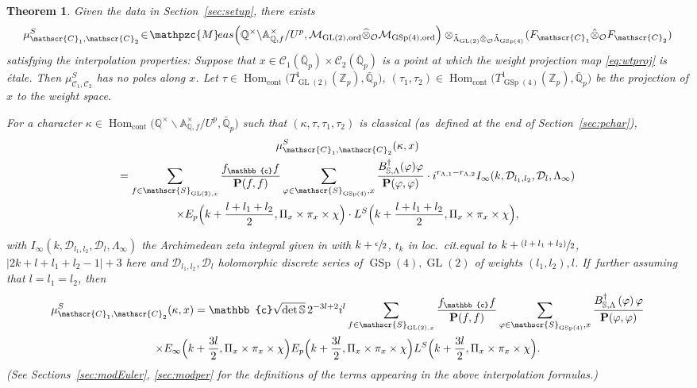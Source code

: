 \documentclass[10pt]{amsart}
\newcommand{\loccit}{loc.\ cit.}
\newcommand{\psfrac}[2]{\sfrac{(#1)}{#2}}
\theoremstyle{plain}
\newtheorem{thm}{Theorem}[subsection]
\theoremstyle{remark}
\newcommand{\bA}{\mathbb{A}}
\newcommand{\bQ}{\mathbb{Q}}
\newcommand{\bS}{\mathbb{S}}
\newcommand{\bZ}{\mathbb{Z}}
\newcommand{\bbc}{\mathbb{c}}
\newcommand{\cD}{\mathcal{D}}
\newcommand{\cM}{\mathcal{M}}
\newcommand{\cO}{\mathcal{O}}
\newcommand{\sC}{\mathscr{C}}
\newcommand{\sS}{\mathscr{S}}
\newcommand{\bfP}{\mathbf{P}}
\DeclareMathOperator{\GL}{GL}
\DeclareMathOperator{\GSp}{GSp}
\newcommand{\Meas}{\mathpzc{M}\mkern-2mu eas}
\newcommand{\cont}{\mathrm{cont}}
\newcommand{\ord}{\mathrm{ord}}
\DeclareMathOperator{\Hom}{Hom}
\let\wh\widehat
\let\bes B
\newcommand{\sLambda}{\scriptscriptstyle{\Lambda}}
\begin{document}
\begin{thm}\label{thm:pFL1}
Given the data in Section~\ref{sec:setup}, there exists
\[
\mu^S_{\sC_1,\sC_2}\!\in\!
\Meas\Bigl(\bQ^\times\backslash\bA^\times_{\bQ,f}/U^p,\cM_{\GL(2),\ord}\wh{\otimes}_{\cO} \cM_{\GSp(4),\ord}\Bigr)
\otimes_{\tilde{\Lambda}_{\GL(2)}\hat{\otimes}_\cO\tilde{\Lambda}_{\GSp(4)}}\!(F_{\sC_1}\hat{\otimes}_\cO F_{\sC_2})
\]
satisfying the interpolation properties: Suppose that $x\in \sC_1(\bar{\bQ}_p)\times\sC_2(\bar{\bQ}_p)$ is a point at which the weight projection map \eqref{eq:wtproj} is \'{e}tale. Then $ \mu^S_{\sC_1,\sC_2}$ has no poles along $x$. Let $\tau\in\Hom_\cont\bigl(T^1_{\GL(2)}(\bZ_p),\bar{\bQ}_p\bigr)$, $(\tau_1,\tau_2)\in \Hom_\cont\bigl(T^1_{\GSp(4)}(\bZ_p),\bar{\bQ}_p\bigr)$ be the projection of $x$ to the weight space.
\par\noindent
\begin{minipage}{\textwidth}
For a character $\kappa\in \Hom_\cont\bigl(\bQ^\times\backslash\bA^\times_{\bQ,f}/U^p,\bar{\bQ}_p\bigr)$ such that $(\kappa,\tau,\tau_1,\tau_2)$ is classical (as~defined at the end of Section~\ref{sec:pchar}),
\begin{multline}\label{eq:partial-int}
\mu^S_{\sC_1,\sC_2}(\kappa,x)\\
=\sum_{f\in \sS_{\GL(2),x}} \frac{f_{\bbc}f}{\bfP(f,f)}\sum_{\varphi\in \sS_{\GSp(4)},x} \frac{\bes^\dagger_{\bS,\Lambda}(\varphi)\varphi}{\bfP(\varphi,\varphi)}
\cdot i^{r_{\sLambda,1}-r_{\sLambda,2}} I_\infty(k,\cD_{l_1,l_2},\cD_l,\Lambda_\infty)\\
\times E_p\Bigl(k+\frac{l+l_1+l_2}{2},\Pi_x\times\pi_x\times \chi\Bigr)\cdot L^S\Bigl(k+\frac{l+l_1+l_2}{2},\Pi_x\times\pi_x\times \chi\Bigr),
\end{multline}
\end{minipage}
\par\smallskip\noindent
with $I_\infty(k,\cD_{l_1,l_2},\cD_l,\Lambda_\infty)$ the Archimedean zeta integral given in \cite[(4.2.5)]{pFL} with $k+\sfrac{\epsilon}{2}$, $t_k$ in \loccit equal to $k+\psfrac{l+l_1+l_2}{2}$, $|2k+l+l_1+l_2-1|+3$ here and $\cD_{l_1,l_2},\cD_l$ holomorphic discrete series of $\GSp(4),\GL(2)$ of weights $(l_1,l_2),l$. If~further assuming that $l=l_1=l_2$, then
\begin{multline*}
\mu^S_{\sC_1,\sC_2}(\kappa,x)
=\bbc\sqrt{\det\bS}\,2^{-3l+2}i^l\sum_{f\in \sS_{\GL(2),x}} \frac{f_{\bbc}f}{\bfP(f,f)}\sum_{\varphi\in \sS_{\GSp(4)},x} \frac{\bes^\dagger_{\bS,\Lambda}\left(\varphi\right)\varphi}{\bfP(\varphi,\varphi)} \\
\times E_\infty \Bigl(k+\frac{3l}{2},\Pi_x\times\pi_x\times \chi\Bigr) E_p\Bigl(k+\frac{3l}{2},\Pi_x\times\pi_x\times \chi\Bigr) L^S\Bigl(k+\frac{3l}{2},\Pi_x\times\pi_x\times \chi\Bigr).
\end{multline*}
(See Sections~\ref{sec:modEuler}, \ref{sec:modper} for the definitions of the terms appearing in the above inter\-polation formulas.)
\end{thm}
\end{document}
